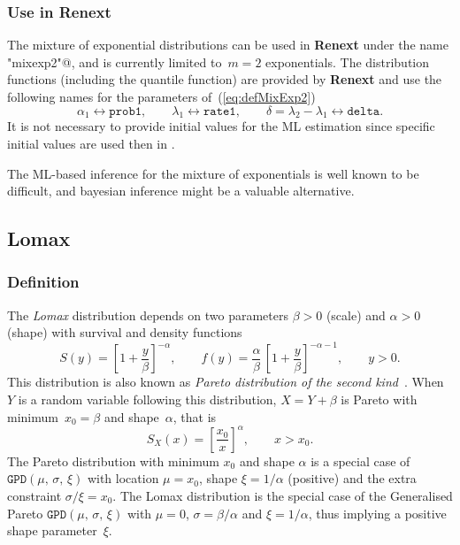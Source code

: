 \documentclass[a4paper]{report}
\newcommand{\pkg}[1]{\textbf{#1}}
\begin{document}
\subsubsection*{Use in Renext}
The mixture of exponential distributions  can be used in \pkg{Renext} under the name 
\verb@"mixexp2"@, and is currently limited to~$m=2$ exponentials.  
The distribution functions (including the quantile function) are provided
by \pkg{Renext} and use the following names for the  parameters of~(\ref{eq:defMixExp2})
$$
   \alpha_1 \leftrightarrow \texttt{prob1}, \qquad \lambda_1 \leftrightarrow \texttt{rate1},
   \qquad \delta= \lambda_2 - \lambda_1 \leftrightarrow \texttt{delta}.
$$
It is not necessary to provide initial values for the ML estimation since 
specific initial values are used then in \verb@Renouv@.

The ML-based inference for the mixture of exponentials is well known to be 
difficult, and bayesian inference might be a valuable alternative.



\subsection{Lomax}
\label{LOMAX}
%

\subsubsection*{Definition}
The \textit{Lomax} distribution depends
on two parameters $\beta>0$ (scale) 
and $\alpha>0$ (shape)  with survival and density functions
\begin{equation}
  \label{eq:SLomax}
  S(y) = \left[1 + \frac{y}{\beta} \right]^{-\alpha}, 
  \qquad
  f(y) = \frac{\alpha}{\beta}\, \left[1 + \frac{y}{\beta} \right]^{-\alpha-1},
  \qquad y > 0.
\end{equation}
This distribution is also known as \textit{Pareto distribution of the second
kind}~\citep{CONTI1}.
%
When $Y$ is a random variable following this distribution, 
$X= Y +\beta$ is Pareto with minimum~$x_0 =\beta$
and shape~$\alpha$, that is 
$$
   S_X(x) = \left[\frac{x_0}{x} \right]^\alpha, \qquad x > x_0.
$$
%
The Pareto distribution with minimum $x_0$ and
shape $\alpha$ is a special case of $\texttt{GPD}(\mu,\,\sigma,\,\xi)$ with 
location $\mu = x_0$, shape $\xi=1/\alpha$ (positive) and the 
extra constraint $\sigma/\xi = x_0$.
The Lomax distribution is the special case of the Generalised Pareto 
$\texttt{GPD}(\mu,\,\sigma,\,\xi)$ with $\mu=0$,
$\sigma = \beta/\alpha$ and $\xi = 1/\alpha$, thus
implying a positive shape parameter~$\xi$.
\end{document}
